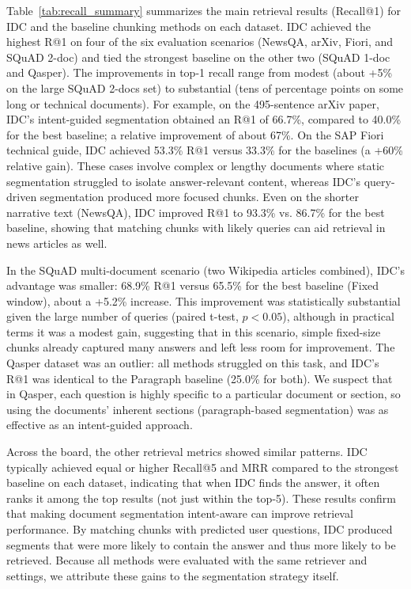 \documentclass[12pt,a4paper]{report}
\begin{document}
Table~\ref{tab:recall_summary} summarizes the main retrieval results (Recall@1) for IDC and the baseline chunking methods on each dataset. IDC achieved the highest R@1 on four of the six evaluation scenarios (NewsQA, arXiv, Fiori, and SQuAD 2-doc) and tied the strongest baseline on the other two (SQuAD 1-doc and Qasper). The improvements in top-1 recall range from modest (about +5\% on the large SQuAD 2-docs set) to substantial (tens of percentage points on some long or technical documents). For example, on the 495-sentence arXiv paper, IDC's intent-guided segmentation obtained an R@1 of 66.7\%, compared to 40.0\% for the best baseline; a relative improvement of about 67\%. On the SAP Fiori technical guide, IDC achieved 53.3\% R@1 versus 33.3\% for the baselines (a +60\% relative gain). These cases involve complex or lengthy documents where static segmentation struggled to isolate answer-relevant content, whereas IDC's query-driven segmentation produced more focused chunks. Even on the shorter narrative text (NewsQA), IDC improved R@1 to 93.3\% vs. 86.7\% for the best baseline, showing that matching chunks with likely queries can aid retrieval in news articles as well.

In the SQuAD multi-document scenario (two Wikipedia articles combined), IDC's advantage was smaller: 68.9\% R@1 versus 65.5\% for the best baseline (Fixed window), about a +5.2\% increase. This improvement was statistically substantial given the large number of queries (paired t-test, $p<0.05$), although in practical terms it was a modest gain, suggesting that in this scenario, simple fixed-size chunks already captured many answers and left less room for improvement. The Qasper dataset was an outlier: all methods struggled on this task, and IDC's R@1 was identical to the Paragraph baseline (25.0\% for both). We suspect that in Qasper, each question is highly specific to a particular document or section, so using the documents' inherent sections (paragraph-based segmentation) was as effective as an intent-guided approach.

Across the board, the other retrieval metrics showed similar patterns. IDC typically achieved equal or higher Recall@5 and MRR compared to the strongest baseline on each dataset, indicating that when IDC finds the answer, it often ranks it among the top results (not just within the top-5). These results confirm that making document segmentation intent-aware can improve retrieval performance. By matching chunks with predicted user questions, IDC produced segments that were more likely to contain the answer and thus more likely to be retrieved. Because all methods were evaluated with the same retriever and settings, we attribute these gains to the segmentation strategy itself. 
\end{document}
